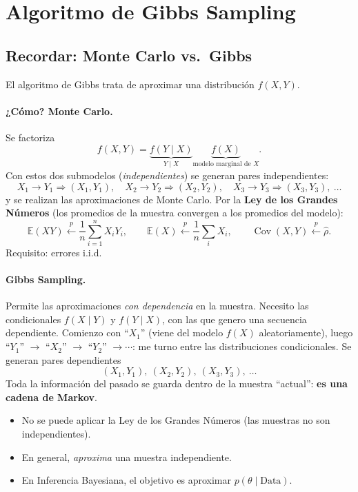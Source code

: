 \documentclass[11pt]{article}
\newcommand{\E}{\mathbb{E}}
\newcommand{\Cov}{\operatorname{Cov}}
\theoremstyle{definition}
\begin{document}
\section{Algoritmo de Gibbs Sampling}

\subsection{Recordar: Monte Carlo vs.\ Gibbs}
El algoritmo de Gibbs trata de aproximar una distribución $f(X,Y)$.

\paragraph{¿Cómo? Monte Carlo.} Se factoriza
\[
f(X,Y)=\underbrace{f(Y\mid X)}_{Y\mid X}\underbrace{f(X)}_{\text{modelo marginal de }X}.
\]
Con estos dos submodelos (\emph{independientes}) se generan pares independientes:
\[
X_1\to Y_1\Rightarrow(X_1,Y_1),\quad X_2\to Y_2\Rightarrow(X_2,Y_2),\quad X_3\to Y_3\Rightarrow(X_3,Y_3),\ \dots
\]
y se realizan las aproximaciones de Monte Carlo. Por la \textbf{Ley de los Grandes Números} (los promedios de la muestra convergen a los promedios del modelo):
\[
\E(XY)\xleftarrow{\ p\ }\frac{1}{n}\sum_{i=1}^n X_i Y_i,\qquad
\E(X)\xleftarrow{\ p\ }\frac{1}{n}\sum_i X_i,\qquad
\Cov(X,Y)\xleftarrow{\ p\ }\hat\rho.
\]
Requisito: errores i.i.d.

\paragraph{Gibbs Sampling.} Permite las aproximaciones \emph{con dependencia} en la muestra. Necesito las condicionales $f(X\mid Y)$ y $f(Y\mid X)$, con las que genero una secuencia dependiente. Comienzo con ``$X_1$'' (viene del modelo $f(X)$ aleatoriamente), luego ``$Y_1$'' $\to$ ``$X_2$'' $\to$ ``$Y_2$'' $\to\cdots$: me turno entre las distribuciones condicionales. Se generan pares dependientes
\[
(X_1,Y_1),\ (X_2,Y_2),\ (X_3,Y_3),\ \dots
\]
Toda la información del pasado se guarda dentro de la muestra ``actual'': \textbf{es una cadena de Markov}.
\begin{itemize}[leftmargin=2em]
  \item No se puede aplicar la Ley de los Grandes Números (las muestras no son independientes).
  \item En general, \emph{aproxima} una muestra independiente.
  \item En Inferencia Bayesiana, el objetivo es aproximar $p(\theta\mid\text{Data})$.
\end{itemize}
\end{document}
